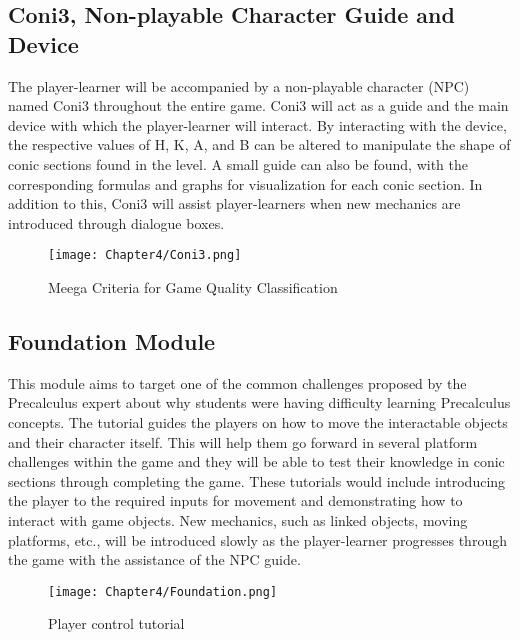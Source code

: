 \subsection{Coni3, Non-playable Character Guide and Device}
\label{sec:coni3}
The player-learner will be accompanied by a non-playable character (NPC) named Coni3 throughout the entire game. Coni3 will act as a guide and the main device with which the player-learner will interact. By interacting with the device, the respective values of H, K, A, and B can be altered to manipulate the shape of conic sections found in the level. A small guide can also be found, with the corresponding formulas and graphs for visualization for each conic section. In addition to this, Coni3 will assist player-learners when new mechanics are introduced through dialogue boxes.

\begin{figure}[H]
\hspace*{-1cm}
   \centering                  
   \texttt{[image: Chapter4/Coni3.png]}      
   \caption{Meega Criteria for Game Quality Classification}
    \label{fig:MeegaCriteria}
\end{figure}

\subsection{Foundation Module}
\label{sec:foundationmodule}
This module aims to target one of the common challenges proposed by the Precalculus expert about why students were having difficulty learning Precalculus concepts. The tutorial guides the players on how to move the interactable objects and their character itself. This will help them go forward in several platform challenges within the game and they will be able to test their knowledge in conic sections through completing the game. 
These tutorials would include introducing the player to the required inputs for movement and demonstrating how to interact with game objects. New mechanics, such as linked objects, moving platforms, etc., will be introduced slowly as the player-learner progresses through the game with the assistance of the NPC guide.

\begin{figure}[H]
\hspace*{-1cm}
   \centering                  
   \texttt{[image: Chapter4/Foundation.png]}      
   \caption{Player control tutorial}
    \label{fig:foundation}
\end{figure}

